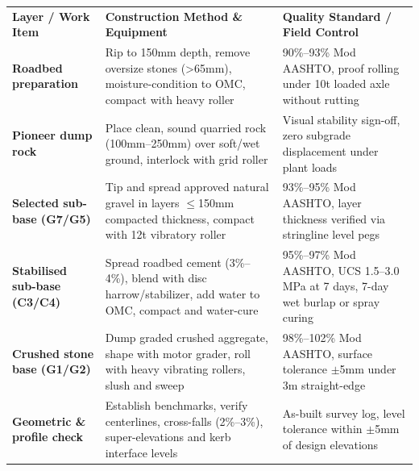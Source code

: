 {\fontsize{7.7pt}{9.8pt}\selectfont
\renewcommand{\arraystretch}{1.23}
\noindent
\begin{tabularx}{\textwidth}{@{}p{3.3cm} p{6.6cm} X@{}}
\rowcolor{mhnavy}
{\color{white}\bfseries Layer / Work Item} & {\color{white}\bfseries Construction Method \& Equipment} & {\color{white}\bfseries Quality Standard / Field Control} \\
\rowcolor{mhbluelight}
\bfseries Roadbed preparation & Rip to 150mm depth, remove oversize stones (>65mm), moisture-condition to OMC, compact with heavy roller & 90\%--93\% Mod AASHTO, proof rolling under 10t loaded axle without rutting \\
\bfseries Pioneer dump rock & Place clean, sound quarried rock (100mm--250mm) over soft/wet ground, interlock with grid roller & Visual stability sign-off, zero subgrade displacement under plant loads \\
\rowcolor{mhbluelight}
\bfseries Selected sub-base (G7/G5) & Tip and spread approved natural gravel in layers $\le$150mm compacted thickness, compact with 12t vibratory roller & 93\%--95\% Mod AASHTO, layer thickness verified via stringline level pegs \\
\bfseries Stabilised sub-base (C3/C4) & Spread roadbed cement (3\%--4\%), blend with disc harrow/stabilizer, add water to OMC, compact and water-cure & 95\%--97\% Mod AASHTO, UCS 1.5--3.0 MPa at 7 days, 7-day wet burlap or spray curing \\
\rowcolor{mhbluelight}
\bfseries Crushed stone base (G1/G2) & Dump graded crushed aggregate, shape with motor grader, roll with heavy vibrating rollers, slush and sweep & 98\%--102\% Mod AASHTO, surface tolerance $\pm$5mm under 3m straight-edge \\
\bfseries Geometric \& profile check & Establish benchmarks, verify centerlines, cross-falls (2\%--3\%), super-elevations and kerb interface levels & As-built survey log, level tolerance within $\pm$5mm of design elevations \\
\end{tabularx}
\renewcommand{\arraystretch}{1}
}

\vfill

